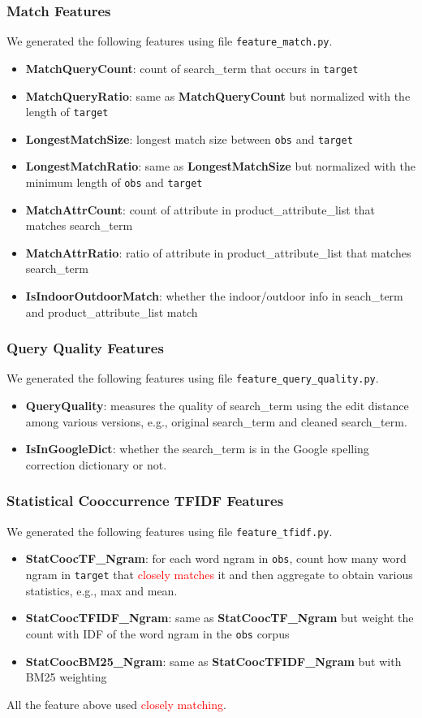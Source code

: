 \documentclass[12pt]{article}
\begin{document}
{{\subsubsection{Match Features}
We generated the following features using file \texttt{feature\_match.py}.
\begin{itemize}
\item \textbf{MatchQueryCount}: count of search\_term that occurs in \texttt{target}
\item \textbf{MatchQueryRatio}: same as \textbf{MatchQueryCount} but normalized with the length of \texttt{target}
\item \textbf{LongestMatchSize}: longest match size between \texttt{obs} and \texttt{target}
\item \textbf{LongestMatchRatio}: same as \textbf{LongestMatchSize} but normalized with the minimum length of \texttt{obs} and \texttt{target}
\item \textbf{MatchAttrCount}: count of attribute in product\_attribute\_list that matches search\_term
\item \textbf{MatchAttrRatio}: ratio of attribute in product\_attribute\_list that matches search\_term
\item \textbf{IsIndoorOutdoorMatch}: whether the indoor/outdoor info in seach\_term and product\_attribute\_list match
\end{itemize}

\subsubsection{Query Quality Features}
We generated the following features using file \texttt{feature\_query\_quality.py}.
\begin{itemize}
\item \textbf{QueryQuality}: measures the quality of search\_term using the edit distance among various versions, e.g., original search\_term and cleaned search\_term.
\item \textbf{IsInGoogleDict}: whether the search\_term is in the Google spelling correction dictionary or not.
\end{itemize}

\subsubsection{Statistical Cooccurrence TFIDF Features}
We generated the following features using file \texttt{feature\_tfidf.py}.
\begin{itemize}
\item \textbf{StatCoocTF\_Ngram}: for each word ngram in \texttt{obs}, count how many word ngram in \texttt{target} that \textcolor{red}{closely matches} it and then aggregate to obtain various statistics, e.g., max and mean.
\item \textbf{StatCoocTFIDF\_Ngram}: same as \textbf{StatCoocTF\_Ngram} but weight the count with IDF of the word ngram in the \texttt{obs} corpus
\item \textbf{StatCoocBM25\_Ngram}: same as \textbf{StatCoocTFIDF\_Ngram} but with BM25 weighting
\end{itemize}
All the feature above used \textcolor{red}{closely matching}.

}}
\end{document}
